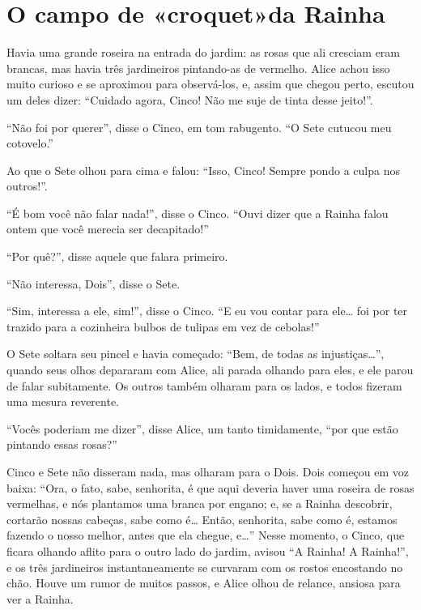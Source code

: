 \quebra\chapter[O campo de «croquet» da Rainha]{O campo de «croquet»\break da Rainha}

Havia uma grande roseira na entrada do jardim: as rosas que ali cresciam
eram brancas, mas havia três jardineiros pintando-as de vermelho. Alice
achou isso muito curioso e se aproximou para observá-los, e, assim que
chegou perto, escutou um deles dizer: ``Cuidado agora, Cinco! Não me suje
de tinta desse jeito!''.

``Não foi por querer'', disse o Cinco, em tom rabugento. ``O Sete
cutucou meu cotovelo.''

Ao que o Sete olhou para cima e falou: ``Isso, Cinco! Sempre pondo a
culpa nos outros!''.

``É bom você não falar nada!'', disse o Cinco. ``Ouvi dizer que a Rainha
falou ontem que você merecia ser decapitado!''

``Por quê?'', disse aquele que falara primeiro.

``Não interessa, Dois'', disse o Sete.

``Sim, interessa a ele, sim!'', disse o Cinco. ``E eu vou contar para
ele\ldots{} foi por ter trazido para a cozinheira bulbos de tulipas em vez de
cebolas!''

O Sete soltara seu pincel e havia começado: ``Bem, de todas as
injustiças\ldots{}'', quando seus olhos depararam com Alice, ali parada
olhando para eles, e ele parou de falar subitamente. Os outros também
olharam para os lados, e todos fizeram uma mesura reverente.

``Vocês poderiam me dizer'', disse Alice, um tanto timidamente, ``por
que estão pintando essas rosas?''

Cinco e Sete não disseram nada, mas olharam para o Dois. Dois começou em
voz baixa: ``Ora, o fato, sabe, senhorita, é que aqui deveria haver uma
roseira de rosas vermelhas, e nós plantamos uma branca por engano; e, se
a Rainha descobrir, cortarão nossas cabeças, sabe como é\ldots{} Então,
senhorita, sabe como é, estamos fazendo o nosso melhor, antes que ela
chegue, e\ldots{}'' Nesse momento, o Cinco, que ficara olhando aflito para o
outro lado do jardim, avisou ``A Rainha! A Rainha!'', e os três
jardineiros instantaneamente se curvaram com os rostos encostando no
chão. Houve um rumor de muitos passos, e Alice olhou de relance, ansiosa
para ver a Rainha.

